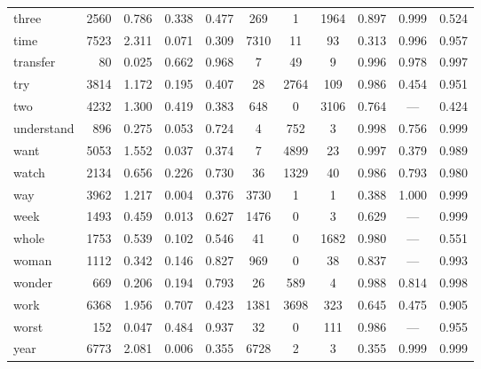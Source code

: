 \begin{landscape}
\begin{longtable}[c]{ l | r r c c | c c c | c c c }
  three      & 2560  & 0.786                   & 0.338           & 0.477      & 269       & 1           & 1964         & 0.897     & 0.999       & 0.524\\
  time       & 7523  & 2.311                   & 0.071           & 0.309      & 7310      & 11          & 93           & 0.313     & 0.996       & 0.957\\
  transfer   & 80    & 0.025                   & 0.662           & 0.968      & 7         & 49          & 9            & 0.996     & 0.978       & 0.997\\
  try        & 3814  & 1.172                   & 0.195           & 0.407      & 28        & 2764        & 109          & 0.986     & 0.454       & 0.951\\
  two        & 4232  & 1.300                   & 0.419           & 0.383      & 648       & 0           & 3106         & 0.764     & —           & 0.424\\
  understand & 896   & 0.275                   & 0.053           & 0.724      & 4         & 752         & 3            & 0.998     & 0.756       & 0.999\\
  want       & 5053  & 1.552                   & 0.037           & 0.374      & 7         & 4899        & 23           & 0.997     & 0.379       & 0.989\\
  watch      & 2134  & 0.656                   & 0.226           & 0.730      & 36        & 1329        & 40           & 0.986     & 0.793       & 0.980\\
  way        & 3962  & 1.217                   & 0.004           & 0.376      & 3730      & 1           & 1            & 0.388     & 1.000       & 0.999\\
  week       & 1493  & 0.459                   & 0.013           & 0.627      & 1476      & 0           & 3            & 0.629     & —           & 0.999\\
  whole      & 1753  & 0.539                   & 0.102           & 0.546      & 41        & 0           & 1682         & 0.980     & —           & 0.551\\
  woman      & 1112  & 0.342                   & 0.146           & 0.827      & 969       & 0           & 38           & 0.837     & —           & 0.993\\
  wonder     & 669   & 0.206                   & 0.194           & 0.793      & 26        & 589         & 4            & 0.988     & 0.814       & 0.998\\
  work       & 6368  & 1.956                   & 0.707           & 0.423      & 1381      & 3698        & 323          & 0.645     & 0.475       & 0.905\\
  worst      & 152   & 0.047                   & 0.484           & 0.937      & 32        & 0           & 111          & 0.986     & —           & 0.955\\
  year       & 6773  & 2.081                   & 0.006           & 0.355      & 6728      & 2           & 3            & 0.355     & 0.999       & 0.999\\


\end{longtable}
\end{landscape}
